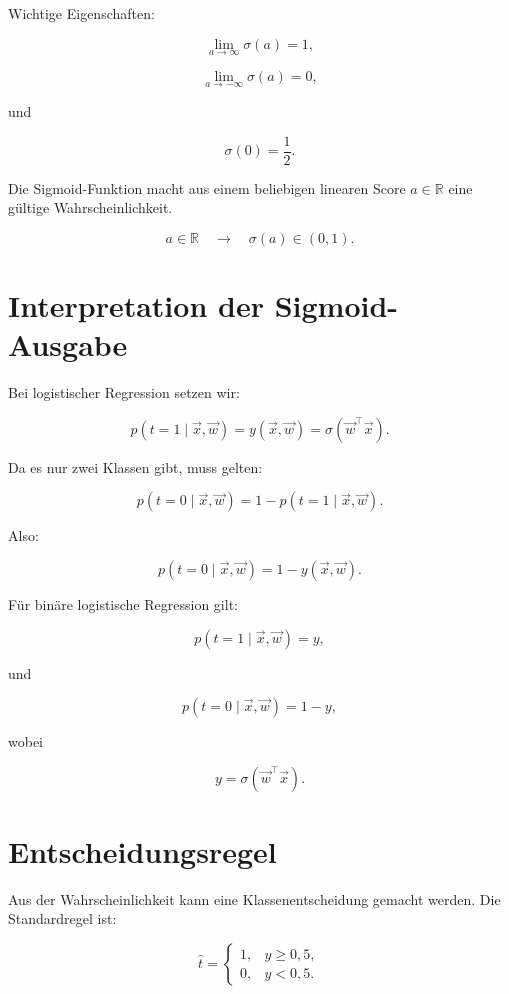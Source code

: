 Wichtige Eigenschaften:

\[
    \lim_{a\to\infty}\sigma(a)=1,
\]

\[
    \lim_{a\to-\infty}\sigma(a)=0,
\]

und

\[
    \sigma(0)=\frac{1}{2}.
\]

\begin{conceptbox}
Die Sigmoid-Funktion macht aus einem beliebigen linearen Score \(a\in\mathbb{R}\) eine gültige Wahrscheinlichkeit.

\[
    a \in \mathbb{R}
    \quad
    \longrightarrow
    \quad
    \sigma(a)\in(0,1).
\]
\end{conceptbox}

\section{Interpretation der Sigmoid-Ausgabe}

Bei logistischer Regression setzen wir:

\[
    p(t=1\mid\vec{x},\vec{w})
    =
    y(\vec{x},\vec{w})
    =
    \sigma(\vec{w}^{\top}\vec{x}).
\]

Da es nur zwei Klassen gibt, muss gelten:

\[
    p(t=0\mid\vec{x},\vec{w})
    =
    1-p(t=1\mid\vec{x},\vec{w}).
\]

Also:

\[
    p(t=0\mid\vec{x},\vec{w})
    =
    1-y(\vec{x},\vec{w}).
\]

\begin{definitionbox}
Für binäre logistische Regression gilt:

\[
    p(t=1\mid\vec{x},\vec{w})
    =
    y,
\]

und

\[
    p(t=0\mid\vec{x},\vec{w})
    =
    1-y,
\]

wobei

\[
    y
    =
    \sigma(\vec{w}^{\top}\vec{x}).
\]
\end{definitionbox}

\section{Entscheidungsregel}

Aus der Wahrscheinlichkeit kann eine Klassenentscheidung gemacht werden.
Die Standardregel ist:

\[
    \hat{t}
    =
    \begin{cases}
        1, & y \geq 0{,}5, \\
        0, & y < 0{,}5.
    \end{cases}
\]

